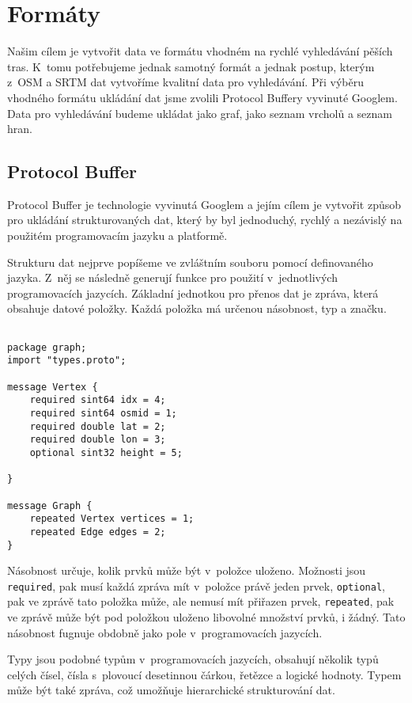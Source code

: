 \chapter{Formáty}
Našim cílem je vytvořit data ve formátu vhodném na rychlé vyhledávání pěších
tras. K~tomu potřebujeme jednak samotný formát a jednak postup, kterým z~OSM a
SRTM dat vytvoříme kvalitní data pro vyhledávání. Při výběru vhodného formátu
ukládání dat jsme zvolili Protocol Buffery\cite{pbfweb} vyvinuté Googlem. Data
pro vyhledávání budeme ukládat jako graf, jako seznam vrcholů a seznam hran.



\section{Protocol Buffer}
Protocol Buffer je technologie vyvinutá Googlem a jejím cílem je vytvořit způsob
pro ukládání strukturovaných dat, který by byl jednoduchý, rychlý a nezávislý na
použitém programovacím jazyku a platformě. 

Strukturu dat nejprve popíšeme ve zvláštním souboru pomocí definovaného
jazyka\cite{pbfspec}. Z~něj se následně generují funkce pro použití
v~jednotlivých programovacích jazycích. Základní jednotkou pro přenos dat je
zpráva, která obsahuje datové položky. Každá položka má určenou násobnost, typ a
značku.

\begin{verbatim}

package graph;
import "types.proto";

message Vertex {
    required sint64 idx = 4;
    required sint64 osmid = 1;
    required double lat = 2;
    required double lon = 3;
    optional sint32 height = 5;
    
}

message Graph {
    repeated Vertex vertices = 1;
    repeated Edge edges = 2;
}
\end{verbatim}

{\tuc Násobnost} určuje, kolik prvků může být v~položce uloženo. Možnosti jsou
\verb|required|, pak musí každá zpráva mít v~položce právě jeden prvek,
\verb|optional|, pak ve zprávě tato položka může, ale nemusí mít přiřazen prvek,
\verb|repeated|, pak ve zprávě může být pod položkou uloženo libovolné množství
prvků, i žádný. Tato násobnost fugnuje obdobně jako pole v~programovacích
jazycích. 

{\tuc Typy} jsou podobné typům v~programovacích jazycích, obsahují několik typů celých
čísel, čísla s~plovoucí desetinnou čárkou, řetězce a logické hodnoty. Typem může
být také zpráva, což umožňuje hierarchické strukturování dat. 

